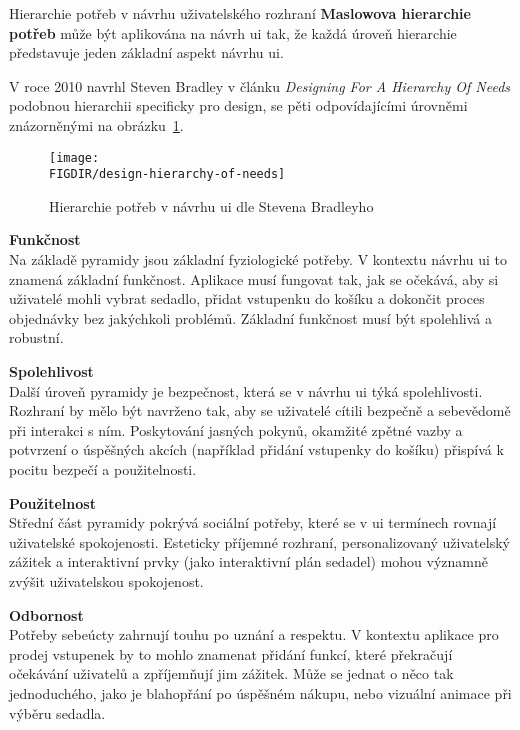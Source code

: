 \begin{subsection}{Hierarchie potřeb v návrhu uživatelského rozhraní}
    \label{subsec:navrh-uzivatelskeho-rozhrani-psychologie-hierarchie}
    \textbf{Maslowova hierarchie potřeb} může být aplikována na návrh \ac{ui} tak, že každá úroveň hierarchie představuje jeden základní aspekt návrhu \ac{ui}.

    V roce 2010 navrhl Steven Bradley v článku \textit{Designing For A Hierarchy Of Needs} podobnou hierarchii specificky pro design, se pěti odpovídajícími úrovněmi znázorněnými na obrázku~\ref{fig:design-hierarchy-of-needs}.\cite{bradley_hierarchy_of_needs}

    \begin{figure}[H]
        \centering
        \texttt{[image: \\FIGDIR/design-hierarchy-of-needs]}
        \caption{Hierarchie potřeb v návrhu \ac{ui} dle Stevena Bradleyho\cite{bradley_hierarchy_of_needs}}
        \label{fig:design-hierarchy-of-needs}
    \end{figure}

    \textbf{Funkčnost}\\
    Na základě pyramidy jsou základní fyziologické potřeby.
    V kontextu návrhu \ac{ui} to znamená základní funkčnost.
    Aplikace musí fungovat tak, jak se očekává, aby si uživatelé mohli vybrat sedadlo, přidat vstupenku do košíku a dokončit proces objednávky bez jakýchkoli problémů.
    Základní funkčnost musí být spolehlivá a robustní.

    \textbf{Spolehlivost}\\
    Další úroveň pyramidy je bezpečnost, která se v návrhu \ac{ui} týká spolehlivosti.
    Rozhraní by mělo být navrženo tak, aby se uživatelé cítili bezpečně a sebevědomě při interakci s ním.
    Poskytování jasných pokynů, okamžité zpětné vazby a potvrzení o úspěšných akcích (například přidání vstupenky do košíku) přispívá k pocitu bezpečí a použitelnosti.

    \textbf{Použitelnost}\\
    Střední část pyramidy pokrývá sociální potřeby, které se v \ac{ui} termínech rovnají uživatelské spokojenosti.
    Esteticky příjemné rozhraní, personalizovaný uživatelský zážitek a interaktivní prvky (jako interaktivní plán sedadel) mohou významně zvýšit uživatelskou spokojenost.

    \textbf{Odbornost}\\
    Potřeby sebeúcty zahrnují touhu po uznání a respektu.
    V kontextu aplikace pro prodej vstupenek by to mohlo znamenat přidání funkcí, které překračují očekávání uživatelů a zpříjemňují jim zážitek.
    Může se jednat o něco tak jednoduchého, jako je blahopřání po úspěšném nákupu, nebo vizuální animace při výběru sedadla.


\end{subsection}
